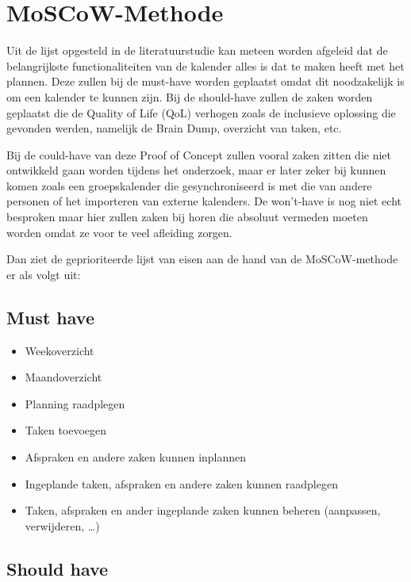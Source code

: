 \section{MoSCoW-Methode}
Uit de lijst opgesteld in de literatuurstudie kan meteen worden afgeleid dat de belangrijkste functionaliteiten van de kalender alles is dat te maken heeft met het plannen. Deze zullen bij de must-have worden geplaatst omdat dit noodzakelijk is om een kalender te kunnen zijn. Bij de should-have zullen de zaken worden geplaatst die de Quality of Life (QoL) verhogen zoals de inclusieve oplossing die gevonden werden, namelijk de Brain Dump, overzicht van taken, etc. \newline

Bij de could-have van deze Proof of Concept zullen vooral zaken zitten die niet ontwikkeld gaan worden tijdens het onderzoek, maar er later zeker bij kunnen komen zoals een groepskalender die gesynchroniseerd is met die van andere personen of het importeren van externe kalenders.  De won't-have is nog niet echt besproken maar hier zullen zaken bij horen die absoluut vermeden moeten worden omdat ze voor te veel afleiding zorgen. \newline

Dan ziet de geprioriteerde lijst van eisen aan de hand van de MoSCoW-methode er als volgt uit:

\subsection{Must have}

    \begin{itemize}
        \item 	Weekoverzicht
        \item 	Maandoverzicht
        \item 	Planning raadplegen
        \item 	Taken toevoegen
        \item 	Afspraken en andere zaken kunnen inplannen
        \item 	Ingeplande taken, afspraken en andere zaken kunnen raadplegen
        \item 	Taken, afspraken en ander ingeplande zaken kunnen beheren (aanpassen, verwijderen, …)
    \end{itemize}


\subsection{Should have}


